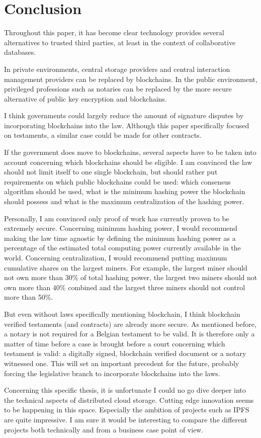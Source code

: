 \chapter{Conclusion}

Throughout this paper, it has become clear technology provides several alternatives to trusted third parties, at least in the context of collaborative databases. 

In  private environments, central storage providers and central interaction management providers can be replaced by blockchains. In the public environment, privileged professions such as notaries can be replaced by the more secure alternative of public key encryption and blockchains.

I think governments could largely reduce the amount of signature disputes by incorporating blockchains into the law. Although this paper specifically focused on testaments, a similar case could be made for other contracts. 

If the government does move to blockchains, several aspects have to be taken into account concerning which blockchains should be eligible. I am convinced the law should not limit itself to one single blockchain, but should rather put requirements on which public blockchains could be used: which consensus algorithm should be used, what is the minimum hashing power the blockchain should possess and what is the maximum centralization of the hashing power. 

Personally, I am convinced only proof of work has currently proven to be extremely secure. Concerning minimum hashing power, I would recommend making the law time agnostic by defining the minimum hashing power as a percentage of the estimated total computing power currently available in the world. Concerning centralization, I would recommend putting maximum cumulative shares on the largest miners. For example, the largest miner should not own more than 30\% of total hashing power, the largest two miners should not own more than 40\% combined and the largest three miners should not control more than 50\%. 

But even without laws specifically mentioning blockchain, I think blockchain verified testaments (and contracts) are already more secure. As mentioned before, a notary is not required for a Belgian testament to be valid. It is therefore only a matter of time before a case is brought before a court concerning which testament is valid: a digitally signed, blockchain verified document or a notary witnessed one. This will set an important precedent for the future, probably forcing the legislative branch to incorporate blockchains into the laws.


Concerning this specific thesis, it is unfortunate I could no go dive deeper into the technical aspects of distributed cloud storage. Cutting edge innovation seems to be happening in this space. Especially the ambition of projects such as IPFS are quite impressive. I am sure it would be interesting to compare the different projects both technically and from a business case point of view.